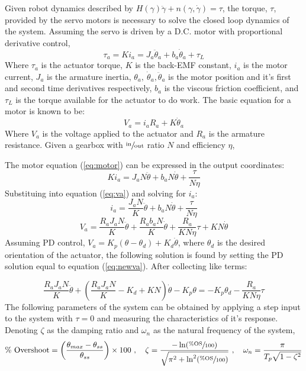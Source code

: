Given robot dynamics described by \(H(\gamma)\ddot{\gamma} + n(\gamma,\dot{\gamma}) = \tau\), the torque, $\tau$, provided by the servo motors is necessary to solve the closed loop dynamics of the system. Assuming the servo is driven by a D.C. motor with proportional derivative control,
\begin{equation}
  \tau_a = Ki_a = J_a\ddot{\theta}_a + b_a\dot{\theta}_a + \tau_L
  \label{eq:motor}
\end{equation}
Where $\tau_a$ is the actuator torque, $K$ is the back-EMF constant, $i_a$ is the motor current, $J_a$ is the armature inertia, $\theta_a,~\dot{\theta}_a,\ddot{\theta}_a$ is the motor position and it's first and second time derivatives respectively, $b_a$ is the viscous friction coefficient, and $\tau_L$ is the torque available for the actuator to do work. The basic equation for a motor is known to be:
\begin{equation}
  V_a = i_aR_a + K\dot{\theta}_a
  \label{eq:va}
\end{equation}
Where $V_a$ is the voltage applied to the actuator and $R_a$ is the armature resistance. Given a gearbox with $\sfrac{\text{in}}{\text{out}}$ ratio $N$ and efficiency $\eta$,

The motor equation (\ref{eq:motor}) can be expressed in the output coordinates:
\[
Ki_a = J_aN\ddot{\theta} + b_aN\dot{\theta} + \frac{\tau}{N\eta}
\]
Substituing into equation (\ref{eq:va}) and solving for $i_a$:
\[
  i_a = \frac{J_aN}{K}\ddot{\theta} + b_aN\dot{\theta} + \frac{\tau}{N\eta}
\]
\begin{equation}
  V_a = \frac{R_aJ_aN}{K}\ddot{\theta} + \frac{R_ab_aN}{K}\dot{\theta} + \frac{R_a}{KN\eta}\tau + KN\dot{\theta}
  \label{eq:newva}
\end{equation}
Assuming PD control, \(V_a = K_p(\theta-\theta_d) + K_d\dot{\theta}\), where $\theta_d$ is the desired orientation of the actuator, the following solution is found by setting the PD solution equal to equation (\ref{eq:newva}). After collecting like terms:

\begin{equation}
  \frac{R_aJ_aN}{K}\ddot{\theta} + \left( \frac{R_aJ_aN}{K} - K_d + KN \right)\dot{\theta} - K_p\theta = -K_p\theta_d - \frac{R_a}{KN\eta}\tau
  \label{eq:end1}
\end{equation}
The following parameters of the system can be obtained by applying a step input to the system with $\tau=0$ and measuring the characteristics of it's response. Denoting $\zeta$ as the damping ratio and $\omega_n$ as the natural frequency of the system,
\[
  \text{\% Overshoot} = \left( \frac{\theta_{max} - \theta_{ss}}{\theta_{ss}} \right) \times 100~,\quad \zeta = \frac{-\ln(\sfrac{\%\text{OS}}{100})}{\sqrt{\pi^2 + \ln^2(\sfrac{\%\text{OS}}{100})}}~,\quad \omega_n = \frac{\pi}{T_p\sqrt{1-\zeta^2}}
\]

